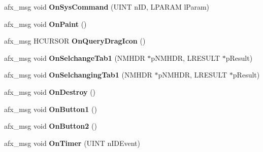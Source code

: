 \begin{DoxyCompactItemize}
\item 
\hypertarget{class_c_wavfrag_dlg_a80d55ac962aaee3f33471012a9d46ad5}{afx\-\_\-msg void {\bfseries On\-Sys\-Command} (U\-I\-N\-T n\-I\-D, L\-P\-A\-R\-A\-M l\-Param)}\label{class_c_wavfrag_dlg_a80d55ac962aaee3f33471012a9d46ad5}

\item 
\hypertarget{class_c_wavfrag_dlg_a833f49ff7a90639fc5b13066999888a3}{afx\-\_\-msg void {\bfseries On\-Paint} ()}\label{class_c_wavfrag_dlg_a833f49ff7a90639fc5b13066999888a3}

\item 
\hypertarget{class_c_wavfrag_dlg_a2d317085844d7c4508455804086e4bd5}{afx\-\_\-msg H\-C\-U\-R\-S\-O\-R {\bfseries On\-Query\-Drag\-Icon} ()}\label{class_c_wavfrag_dlg_a2d317085844d7c4508455804086e4bd5}

\item 
\hypertarget{class_c_wavfrag_dlg_a3375a76434c70e6bca202ba588d3f4d5}{afx\-\_\-msg void {\bfseries On\-Selchange\-Tab1} (N\-M\-H\-D\-R $\ast$p\-N\-M\-H\-D\-R, L\-R\-E\-S\-U\-L\-T $\ast$p\-Result)}\label{class_c_wavfrag_dlg_a3375a76434c70e6bca202ba588d3f4d5}

\item 
\hypertarget{class_c_wavfrag_dlg_a6f710189cdc3cebe771db91bdb5197d6}{afx\-\_\-msg void {\bfseries On\-Selchanging\-Tab1} (N\-M\-H\-D\-R $\ast$p\-N\-M\-H\-D\-R, L\-R\-E\-S\-U\-L\-T $\ast$p\-Result)}\label{class_c_wavfrag_dlg_a6f710189cdc3cebe771db91bdb5197d6}

\item 
\hypertarget{class_c_wavfrag_dlg_a49cdde1e2c4c45873367f5e6ab88fc25}{afx\-\_\-msg void {\bfseries On\-Destroy} ()}\label{class_c_wavfrag_dlg_a49cdde1e2c4c45873367f5e6ab88fc25}

\item 
\hypertarget{class_c_wavfrag_dlg_a7ec3dc49fed1ff9c1200630c187b8de6}{afx\-\_\-msg void {\bfseries On\-Button1} ()}\label{class_c_wavfrag_dlg_a7ec3dc49fed1ff9c1200630c187b8de6}

\item 
\hypertarget{class_c_wavfrag_dlg_ab9519cb096c61d25ce85aeac05de9303}{afx\-\_\-msg void {\bfseries On\-Button2} ()}\label{class_c_wavfrag_dlg_ab9519cb096c61d25ce85aeac05de9303}

\item 
\hypertarget{class_c_wavfrag_dlg_a19c60be6ede3f014698c7b418c27c0d1}{afx\-\_\-msg void {\bfseries On\-Timer} (U\-I\-N\-T n\-I\-D\-Event)}\label{class_c_wavfrag_dlg_a19c60be6ede3f014698c7b418c27c0d1}


\end{DoxyCompactItemize}
